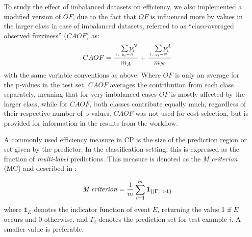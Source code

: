 \documentclass[utf8]{frontiersSCNS} %
\begin{document}
To study the effect of imbalanced datasets on efficiency, we also implemented a
modified version of $OF$, due to the fact that $OF$ is influenced more
by values in the larger class in case of imbalanced datasets, referred to as
``class-averaged
observed fuzziness'' ($CAOF$) as:
\begin{equation}
CAOF = \frac
        {\quad\sum\limits_{\mathclap{\substack{\scriptscriptstyle i,\ y_i=A}}}p_i^N}
        {m_A}
       + \frac
        {\quad\sum\limits_{\mathclap{\substack{\scriptscriptstyle i,\ y_i=N}}}p_i^A}
        {m_N}
\end{equation}
with the same variable conventions as above. Where $OF$ is only an average for
the p-values in the test set, $CAOF$ averages the contribution from each class
separately, meaning that for very imbalanced cases $OF$ is mostly affected by
the larger class, while for $CAOF$, both classes contribute equally much,
regardless of their respective number of p-values.
%
%
%
$CAOF$ was not used for cost selection, but is provided for information in the
results from the workflow.

A commonly used efficiency measure in CP is the size of the prediction region or set 
given by the predictor. In the classification setting, this is expressed as the fraction of
\textit{multi-label} predictions. This measure is denoted as the \textit{M criterion} (MC) and described
in \cite{Vovk2016}:

\begin{equation}
\text{\textit{M criterion}} = \frac{ 1}{m} \sum\limits_{i=1}^{m}  \boldsymbol{1}_{\{|\Gamma_i|>1\}}	
\end{equation}
where $\boldsymbol{1}_E$ denotes the indicator function of event $E$, returning the 
value 1 if $E$ occurs and 0 otherwise, and $\Gamma_i$ denotes the prediction set 
for test example $i$.  A smaller value is preferable. 
\end{document}

